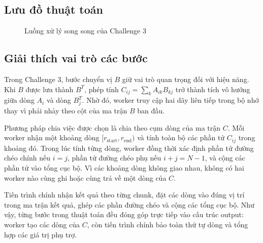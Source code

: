 \subsection{Lưu đồ thuật toán}
\begin{figure}[H]
\centering
{}
\caption{Luồng xử lý song song của Challenge 3}
\label{fig:challenge3-flow}
\end{figure}

\subsection{Giải thích vai trò các bước}
Trong Challenge 3, bước chuyển vị $B$ giữ vai trò quan trọng đối với hiệu năng. Khi $B$ được lưu thành $B^T$, phép tính $C_{ij} = \sum_k A_{ik}B_{kj}$ trở thành tích vô hướng giữa dòng $A_i$ và dòng $B^T_j$. Nhờ đó, worker truy cập hai dãy liên tiếp trong bộ nhớ thay vì phải nhảy theo cột của ma trận $B$ ban đầu.

Phương pháp chia việc được chọn là chia theo cụm dòng của ma trận $C$. Mỗi worker nhận một khoảng dòng $[r_{\mathrm{start}}, r_{\mathrm{end}})$ và tính toàn bộ các phần tử $C_{ij}$ trong khoảng đó. Trong lúc tính từng dòng, worker đồng thời xác định phần tử đường chéo chính nếu $i=j$, phần tử đường chéo phụ nếu $i+j=N-1$, và cộng các phần tử vào tổng cục bộ. Vì các khoảng dòng không giao nhau, không có hai worker nào cùng ghi hoặc cùng trả về một dòng của $C$.

Tiến trình chính nhận kết quả theo từng chunk, đặt các dòng vào đúng vị trí trong ma trận kết quả, ghép các phần đường chéo và cộng các tổng cục bộ. Như vậy, từng bước trong thuật toán đều đóng góp trực tiếp vào cấu trúc output: worker tạo các dòng của $C$, còn tiến trình chính bảo toàn thứ tự dòng và tổng hợp các giá trị phụ trợ.

